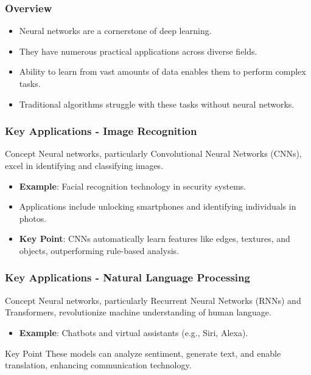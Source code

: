 \documentclass[aspectratio=169]{beamer}
\begin{document}
\begin{frame}[fragile]
  \frametitle{Overview}
  \begin{itemize}
    \item Neural networks are a cornerstone of deep learning.
    \item They have numerous practical applications across diverse fields.
    \item Ability to learn from vast amounts of data enables them to perform complex tasks.
    \item Traditional algorithms struggle with these tasks without neural networks.
  \end{itemize}
\end{frame}

\begin{frame}[fragile]
  \frametitle{Key Applications - Image Recognition}
  \begin{block}{Concept}
    Neural networks, particularly Convolutional Neural Networks (CNNs), excel in identifying and classifying images.
  \end{block}
  \begin{itemize}
    \item \textbf{Example}: Facial recognition technology in security systems.
    \item Applications include unlocking smartphones and identifying individuals in photos.
    \item \textbf{Key Point}: CNNs automatically learn features like edges, textures, and objects, outperforming rule-based analysis.
  \end{itemize}
\end{frame}

\begin{frame}[fragile]
  \frametitle{Key Applications - Natural Language Processing}
  \begin{block}{Concept}
    Neural networks, particularly Recurrent Neural Networks (RNNs) and Transformers, revolutionize machine understanding of human language.
  \end{block}
  \begin{itemize}
    \item \textbf{Example}: Chatbots and virtual assistants (e.g., Siri, Alexa).
  \end{itemize}
  \begin{block}{Key Point}
    These models can analyze sentiment, generate text, and enable translation, enhancing communication technology.
  \end{block}
\end{frame}
\end{document}
